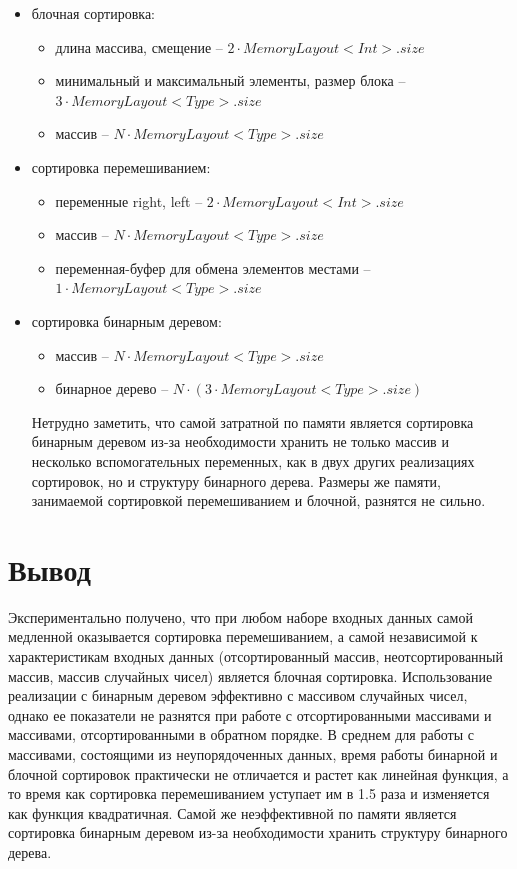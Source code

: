 \begin{itemize}
\item блочная сортировка:\begin{itemize}
	\item длина массива, смещение -- $2 \cdot MemoryLayout<Int>.size$
	\item минимальный и максимальный элементы, размер блока -- $3 \cdot MemoryLayout<Type>.size$
	\item массив -- $N \cdot MemoryLayout<Type>.size$
\end{itemize}

\item сортировка перемешиванием:\begin{itemize}
	\item переменные right, left -- $2 \cdot MemoryLayout<Int>.size$
	\item массив -- $N \cdot MemoryLayout<Type>.size$
	\item переменная-буфер для обмена элементов местами -- $1 \cdot  MemoryLayout<Type>.size$
\end{itemize}

\item сортировка бинарным деревом:\begin{itemize}
	\item массив -- $N \cdot MemoryLayout<Type>.size$
	\item бинарное дерево -- $N \cdot (3 \cdot MemoryLayout<Type>.size)$
\end{itemize}

Нетрудно заметить, что самой затратной по памяти является сортировка бинарным деревом из-за необходимости хранить не только массив и несколько вспомогательных переменных, как в двух других реализациях сортировок, но и структуру бинарного дерева. Размеры же памяти, занимаемой сортировкой перемешиванием и блочной, разнятся не сильно. 

\end{itemize}
	
\section*{Вывод}
Экспериментально получено, что при любом наборе входных данных самой медленной оказывается сортировка перемешиванием, а самой независимой к характеристикам входных данных (отсортированный массив, неотсортированный массив, массив случайных чисел) является блочная сортировка. Использование реализации с бинарным деревом эффективно с массивом случайных чисел, однако ее показатели не разнятся при работе с отсортированными массивами и массивами, отсортированными в обратном порядке. В среднем для работы с массивами, состоящими из неупорядоченных данных, время работы бинарной и блочной сортировок практически не отличается и растет как линейная функция, а то время как сортировка перемешиванием уступает им в 1.5 раза и изменяется как функция квадратичная. Самой же неэффективной по памяти является сортировка бинарным деревом из-за необходимости хранить структуру бинарного дерева. 

